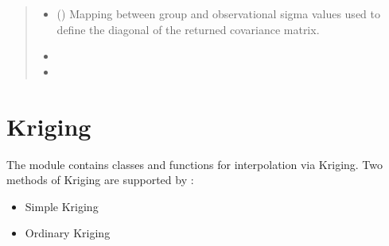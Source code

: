 \documentclass[letterpaper,10pt,english]{sphinxmanual}
\begin{document}
\begin{fulllineitems}
\begin{quote}
\begin{description}
\begin{itemize}
\item {}
\sphinxAtStartPar
{} (\sphinxstyleliteralemphasis{\sphinxupquote{{[}}}\sphinxstyleliteralemphasis{\sphinxupquote{, }}\sphinxstyleliteralemphasis{\sphinxupquote{{]} }}\sphinxstyleliteralemphasis{\sphinxupquote{| }}) \textendash{} Mapping between group and observational sigma values used to define
the diagonal of the returned covariance matrix.

\end{itemize}

\sphinxAtStartPar
{}

\sphinxAtStartPar
\begin{itemize}
\item {}
\sphinxAtStartPar
{}

\item {}
\sphinxAtStartPar
{}

\end{itemize}


\end{description}\end{quote}

\end{fulllineitems}


\sphinxstepscope


\chapter{Kriging}
\label{\detokenize{kriging:kriging}}\label{\detokenize{kriging::doc}}
\sphinxAtStartPar
The  module contains classes and functions for interpolation via Kriging.
Two methods of Kriging are supported by :
\begin{itemize}
\item {}
\sphinxAtStartPar
Simple Kriging

\item {}
\sphinxAtStartPar
Ordinary Kriging

\end{itemize}
\end{document}
